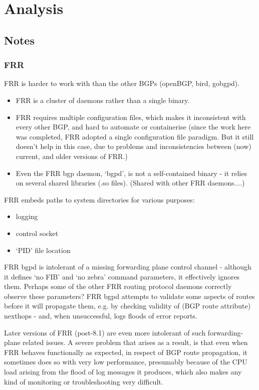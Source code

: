 \chapter{Analysis}
\section{Notes}
\subsection{FRR}

FRR is harder to work with than the other BGPs (openBGP, bird, gobgpd).
\begin{itemize}
	\item FRR is a cluster of daemons rather than a single binary.
	\item FRR requires multiple configuration files, which makes it inconsistent with every other BGP, and hard to automate or containerise (since the work here was completed, FRR adopted a single configuration file paradigm.  But it still doesn't help in this case, due to problems and inconsistencies between (now) current, and older versions of FRR.)
	\item Even the FRR bgp daemon, `bgpd', is not a self-contained binary - it relies on several shared libraries (.so files).  (Shared with other FRR daemons....)
\end{itemize}
FRR embeds paths to system directories for various purposes:
\begin{itemize}
	\item logging
	\item control socket
	\item `PID' file location
\end{itemize}
FRR bgpd is intolerant of a missing forwarding plane control channel -
although it defines `no FIB' and `no zebra' command parameters, it effectively ignores them.
Perhaps some of the other FRR routing protocol daemons correctly observe these parameters?
FRR bgpd attempts to validate some aspects of routes before it will propagate them, e.g. by checking validity of (BGP route attribute) nexthops - and, when unsuccessful, logs floods of error reports.

Later versions of FRR (post-8.1) are even more intolerant of such forwarding-plane related issues.
A severe problem that arises as a result, is that even when FRR behaves functionally as expected,
in respect of BGP route propagation, it sometimes does so with very low performance,
presumably because of the CPU load arising from the flood of log messages it produces,
which also makes any kind of monitoring or troubleshooting very difficult.

